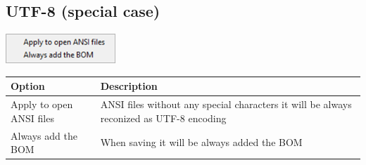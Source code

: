 \hypertarget{menu_format_utf8}{}
\subsection{UTF-8 (special case)}

\includegraphics[scale=0.8]{./res/menu_format_utf8.png}\\

\begin{scriptsize}
  \begin{tabularx}{\textwidth}{>{\hsize=0.4\hsize}X>{\hsize=0.6\hsize}X}\\
    \hline
    \textbf{Option} & \textbf{Description} \\
    \hline
    Apply to open ANSI files & ANSI files without any special characters it will be always
      reconized as UTF-8 encoding \\
    Always add the BOM & When saving it will be always added the BOM \\
    \hline
  \end{tabularx}
\end{scriptsize}
